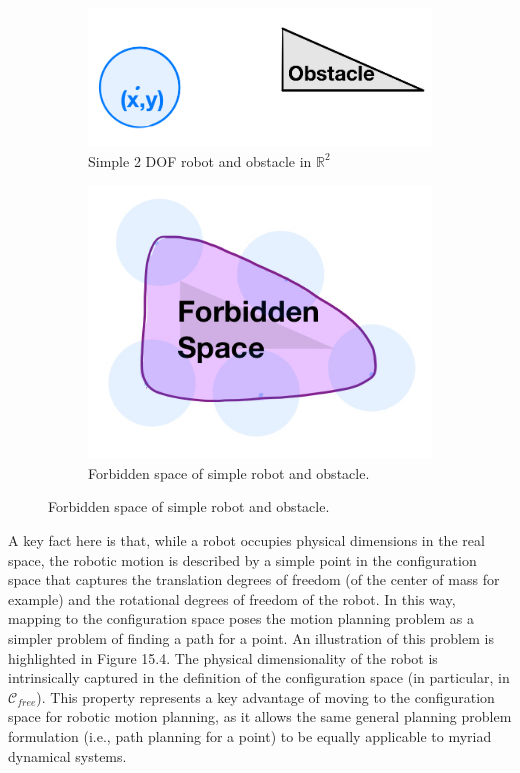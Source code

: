\documentclass[twoside]{article}
\begin{document}
 \begin{figure}
 \centering
 \begin{subfigure}[b]{0.35\textwidth}
 	\includegraphics[width=\textwidth]{forbidden_space_robot_obstacle}
	\caption{Simple 2 DOF robot and obstacle in $\mathbb{R}^2$}
 \end{subfigure}
 \begin{subfigure}[b]{0.3\textwidth}
 	\includegraphics[width=\textwidth]{forbidden_space}
	\caption{Forbidden space of simple robot and obstacle.}
 \end{subfigure}
\end{figure}
 
 
 A key fact here is that, while a robot occupies physical dimensions in the real space, the robotic motion is described by a simple point in the configuration space that captures the translation degrees of freedom (of the center of mass for example) and the rotational degrees of freedom of the robot. In this way, mapping to the configuration space poses the motion planning problem as a simpler problem of finding a path for a point. An illustration of this problem is highlighted in Figure 15.4. The physical dimensionality of the robot is intrinsically captured in the definition of the configuration space (in particular, in $\mathcal{C}_{free}$). This property represents a key advantage of moving to the configuration space for robotic motion planning, as it allows the same general planning problem formulation (i.e., path planning for a point) to be equally applicable to myriad dynamical systems.
\end{document}
